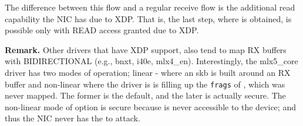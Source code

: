 The difference between this flow and a regular receive flow is the additional read capability the NIC has due to XDP. That is, the last step, where \means{} is obtained, is possible only with READ access granted due to XDP.

\smallskip
\noindent\textbf{Remark.} Other drivers that have XDP support, also tend to map RX buffers with BIDIRECTIONAL (e.g., bnxt, i40e, mlx4\_en). Interestingly, the mlx5\_core driver has two modes of operation; linear - where an skb is built around an RX buffer and non-linear where the driver is is filling up the \texttt{frags} of \shinfo, which was never mapped. The former is the default, and the later is actually secure. The non-linear mode of option is secure because \shinfo{} is never accessible to the device; and thus the NIC never has the \oportunity{} to attack.

